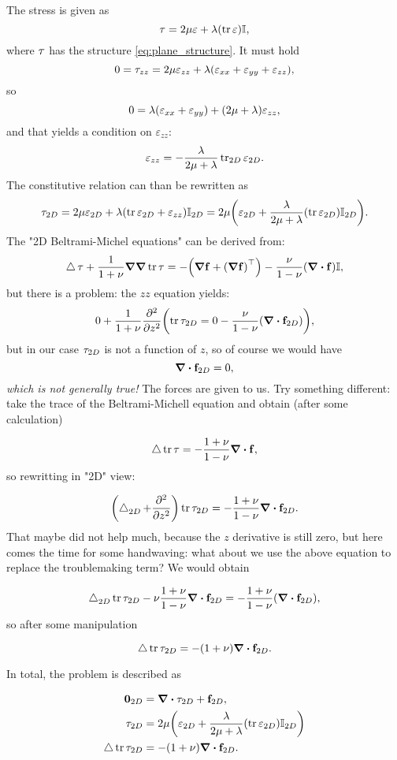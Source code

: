 \documentclass[reqno, a4paper]{article}
\begin{document}
The stress is given as
\[
	\mathbb{\tau} = 2 \mu \mathbb{\varepsilon} + \lambda \qty(\tr \mathbb{\varepsilon})\mathbb{I},
\]
where $\mathbb{\tau}$ has the structure \ref{eq:plane_structure}. It must hold
\[
	0 = \tau_{zz} = 2 \mu \varepsilon_{zz}+\lambda\qty(\varepsilon_{xx}+\varepsilon_{yy}+\varepsilon_{zz}),
\]
so 
\[
	0 = \lambda\qty(\varepsilon_{xx}+ \varepsilon_{yy})+\qty(2 \mu + \lambda)\varepsilon_{zz},
\]
and that yields a condition on $\varepsilon_{zz}$:
\[
	\varepsilon_{zz} = -\frac{\lambda}{2 \mu+ \lambda} \tr_{2D}\mathbb{\varepsilon}_{2D}.
\]
The constitutive relation can than be rewritten as
\[
	\mathbb{\tau}_{2D} = 2 \mu \mathbb{\varepsilon}_{2D}+ \lambda \qty(\tr \mathbb{\varepsilon}_{2D}+\varepsilon_{zz})\mathbb{I}_{2D} = 2 \mu\qty(\mathbb{\varepsilon}_{2D}+\frac{\lambda}{2 \mu+\lambda}\qty(\tr \mathbb{\varepsilon}_{2D})\mathbb{I}_{2D}).
\]
The "2D Beltrami-Michel equations" can be derived from:
\[
	\laplace \tensorq{\tau}+\frac{1}{1+\nu} \grad \grad \tr \tensorq{\tau} = -\qty(\grad \vb{f} +\transpose{\qty(\grad \vb{f})}) - \frac{\nu}{1-\nu} \qty(\divergence{\vb{f}})\identity,
\]
but there is a problem: the $zz$ equation yields: 
\[
	0 + \frac{1}{1+\nu}\pdv[2]{z}\qty(\tr \tensorq{\tau}_{2D} = 0 - \frac{\nu}{1- \nu}\qty(\divergence{\vb{f}_{2D}})),
\]
but in our case $\mathbb{\tau}_{2D}$ is not a function of $z$, so of course we would have
\[
	\divergence{\vb{f}_{2D}} = 0,
\]
\textit{which is not generally true!} The forces are given to us. Try something different: take the trace of the Beltrami-Michell equation and obtain (after some calculation)

\[
	\laplace \tr \tensorq{\tau} = - \frac{1+\nu}{1-\nu} \divergence{\vb{f}},
\]
so rewritting in "2D" view:

\[
	\qty(\laplace_{2D}+\pdv[2]{z})\tr \tensorq{\tau}_{2D} = -\frac{1+\nu}{1-\nu}\divergence{\vb{f}_{2D}}.
\]
That maybe did not help much, because the $z$ derivative is still zero, but here comes the time for some handwaving: what about we use the above equation to replace the troublemaking term? We would obtain

\[
	\laplace_{2D} \tr \tensorq{\tau}_{2D} - \nu \frac{1+ \nu}{1- \nu} \divergence{\vb{f}_{2D}} = - \frac{1+\nu}{1- \nu}\qty(\divergence{ \vb{f}_{2D}}),
\]
so after some manipulation

\[
	\laplace \tr \tensorq{\tau}_{2D} = -\qty(1+\nu)\divergence{\vb{f}_{2D}}.
\]

In total, the problem is described as

\begin{align}
  \label{eq:plane_stress_formulation}
  \vb{0}_{2D} &= \divergence{\tensorq{\tau}_{2D}} + \vb{f}_{2D},\\
  \tensorq{\tau}_{2D} &= 2 \mu\qty(\tensorq{\varepsilon}_{2D}+\frac{\lambda}{2 \mu+\lambda}\qty(\tr \tensorq{\varepsilon}_{2D})\identity_{2D}) \\
  \laplace \tr \tensorq{\tau}_{2D} &= -\qty(1+\nu)\divergence{\vb{f}_{2D}}.
\end{align}
\end{document}

